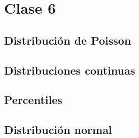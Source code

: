 \chapter{Clase 6}

\section{Distribución de Poisson}

\section{Distribuciones continuas}

\section{Percentiles}

\section{Distribución normal}